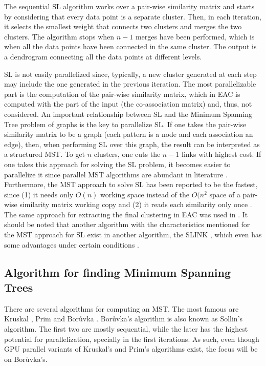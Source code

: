 The sequential SL algorithm works over a pair-wise similarity matrix and starts by considering that every data point is a separate cluster.
Then, in each iteration, it selects the smallest weight that connects two clusters and merges the two clusters.
The algorithm stops when $n-1$ merges have been performed, which is when all the data points have been connected in the same cluster.
The output is a dendrogram connecting all the data points at different levels.

SL is not easily parallelized since, typically, a new cluster generated at each step may include the one generated in the previous iteration.
The most parallelizable part is the computation of the pair-wise similarity matrix, which in EAC is computed with the part of the input (the co-association matrix) and, thus, not considered.
An important relationship between SL and the Minimum Spanning Tree problem of graphs is the key to parallelize SL.
If one takes the pair-wise similarity matrix to be a graph (each pattern is a node and each association an edge), then, when performing SL over this graph, the result can be interpreted as a structured MST.
To get $n$ clusters, one cuts the $n-1$ links with highest cost.
If one takes this approach for solving the SL problem, it becomes easier to parallelize it since parallel MST algorithms are abundant in literature \cite{Vineet2009,rostrup2013fast,Sousa2015}.
Furthermore, the MST approach to solve SL has been reported to be the fastest, since (1) it needs only $O(n)$ working space instead of the $O(n^2$ space of a pair-wise similarity matrix working copy and (2) it reads each similarity only once \cite{Mullner2011}.
The same approach for extracting the final clustering in EAC was used in \cite{Fred2002}.
It should be noted that another algorithm with the characteristics mentioned for the MST approach for SL exist in another algorithm, the SLINK \cite{Sibson1973}, which even has some advantages under certain conditions \cite{Mullner2011}.

\subsection{Algorithm for finding Minimum Spanning Trees}
There are several algorithms for computing an MST.
The most famous are Kruskal \citep{kruskal1956shortest}, Prim \citep{prim1957shortest} and Borůvka \citep{boruuvka1926jistem}.
Borůvka's algorithm is also known as Sollin's algorithm.
The first two are mostly sequential, while the later has the highest potential for parallelization, specially in the first iterations.
As such, even though GPU parallel variants of Kruskal's \citep{rostrup2013fast} and Prim's \citep{wang2011design} algorithms exist, the focus will be on Borůvka's.%

